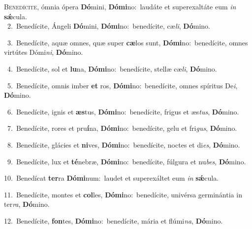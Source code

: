 \lettrine{\initial\textcolor{\initialcolor}{B}}{enedícite,} ómnia ópera \textbf{Dó}\-mini, \textbf{Dó}\-\textbf{mi}no:~\star laudáte et superexaltáte eum \textit{in} \textbf{sǽ}\-cula.\\
{\numbfont\textcolor{\numbcolor}{~2.}}~Benedícite, Ángeli \textbf{Dó}\-mini, \textbf{Dó}\-\textbf{mi}no:~\star benedícite, cæ\-\textit{li}\-, \textbf{Dó}\-mino.\par
{\numbfont\textcolor{\numbcolor}{~3.}}~Benedícite, aquæ omnes, quæ super \textbf{cæ}\-los sunt, \textbf{Dó}\-\textbf{mi}no:~\star benedícite, omnes virtútes Dómi\-\textit{ni}\-, \textbf{Dó}\-mino.\par
{\numbfont\textcolor{\numbcolor}{~4.}}~Benedícite, sol et \textbf{lu}\-na, \textbf{Dó}\-\textbf{mi}no:~\star benedícite, stellæ cæ\-\textit{li}\-, \textbf{Dó}\-mino.\par
{\numbfont\textcolor{\numbcolor}{~5.}}~Benedícite, omnis imber \textbf{et} ros, \textbf{Dó}\-\textbf{mi}no:~\star benedícite, omnes spíritus De\-\textit{i}\-, \textbf{Dó}\-mino.\par
{\numbfont\textcolor{\numbcolor}{~6.}}~Benedícite, ignis et \textbf{æs}\-tus, \textbf{Dó}\-\textbf{mi}no:~\star benedícite, frigus et æs\-\textit{tus}\-, \textbf{Dó}\-mino.\par
{\numbfont\textcolor{\numbcolor}{~7.}}~Benedícite, rores et pru\-\textbf{í}\-na, \textbf{Dó}\-\textbf{mi}no:~\star benedícite, gelu et fri\-\textit{gus}\-, \textbf{Dó}\-mino.\par
{\numbfont\textcolor{\numbcolor}{~8.}}~Benedícite, glácies et \textbf{ni}\-ves, \textbf{Dó}\-\textbf{mi}no:~\star benedícite, noctes et di\-\textit{es}\-, \textbf{Dó}\-mino.\par
{\numbfont\textcolor{\numbcolor}{~9.}}~Benedícite, lux et \textbf{té}\-nebræ, \textbf{Dó}\-\textbf{mi}no:~\star benedícite, fúlgura et nu\-\textit{bes}\-, \textbf{Dó}\-mino.\par
{\numbfont\textcolor{\numbcolor}{10.}}~Benedícat \textbf{ter}\-ra \textbf{Dó}\-\textbf{mi}num:~\star laudet et superexáltet eum \textit{in} \textbf{sǽ}\-cula.\par
{\numbfont\textcolor{\numbcolor}{11.}}~Benedícite, montes et \textbf{col}\-les, \textbf{Dó}\-\textbf{mi}no:~\star benedícite, univérsa germinántia in ter\-\textit{ra}\-, \textbf{Dó}\-mino.\par
{\numbfont\textcolor{\numbcolor}{12.}}~Benedícite, \textbf{fon}\-tes, \textbf{Dó}\-\textbf{mi}no:~\star benedícite, mária et flúmi\-\textit{na}\-, \textbf{Dó}\-mino.\par
